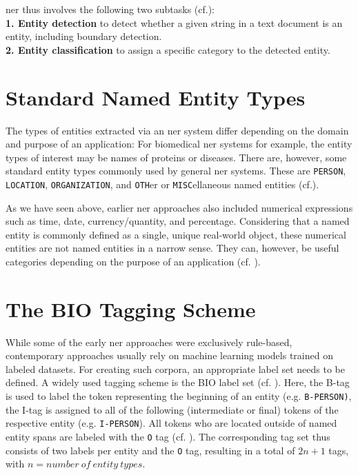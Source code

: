 \gls{ner} thus involves the following two subtasks (cf.\cite[229]{zong_information_2021}): \\ \newline
\textbf{1. Entity detection} to detect whether a given string in a text document is an entity, including boundary detection.\\ \newline
\textbf{2. Entity classification} to assign a specific category to the detected entity. 


\section{Standard Named Entity Types}
The types of entities extracted via an \gls{ner} system differ depending on the domain and purpose of an application: For biomedical \gls{ner} systems for example, the entity types of interest may be names of proteins or diseases. There are, however, some standard entity types commonly used by general \gls{ner} systems. These are \verb|PERSON|, \verb|LOCATION|, \verb|ORGANIZATION|, and \verb|OTH|er or \verb|MISC|ellaneous named entities (cf.\cite[229]{zong_information_2021}).

As we have seen above, earlier \gls{ner} approaches also included numerical expressions such as time, date, currency/quantity, and percentage. Considering that a named entity is commonly defined as a single, unique real-world object, these numerical entities are not named entities in a narrow sense. They can, however, be useful categories depending on the purpose of an application (cf. \cite[386]{aggarwal_machine_2018}).

\section{The BIO Tagging Scheme}
\label{bio_tagging}
While some of the early \gls{ner} approaches were exclusively rule-based, contemporary approaches usually rely on machine learning models trained on labeled datasets. For creating such corpora, an appropriate label set needs to be defined. A widely used tagging scheme is the BIO label set (cf. \cite{ramshaw-marcus-1995-text}). Here, the B-tag is used to label the token representing the beginning of an entity (e.g. \verb|B-PERSON)|, the I-tag is assigned to all of the following (intermediate or final) tokens of the respective entity (e.g. \verb|I-PERSON|). All tokens who are located outside of named entity spans are labeled with the \verb|O| tag (cf. \cite[231]{zong_information_2021}). The corresponding tag set thus consists of two labels per entity and the \verb|O| tag, resulting in a total of $2n + 1$ tags, with $n = number\:of\:entity\:types$. 

